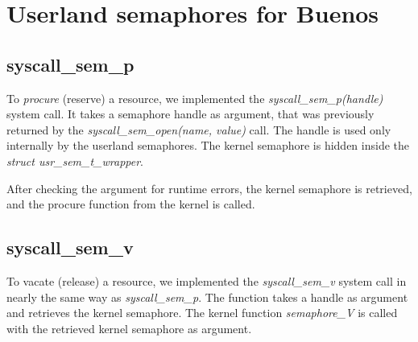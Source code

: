\documentclass[11pt]{article}
\begin{document}
\section{Userland semaphores for Buenos}
\subsection{syscall\_sem\_p}
To \emph{procure} (reserve) a resource, we implemented the \emph{syscall\_sem\_p(handle)} system call. It takes a semaphore handle as argument, that was previously returned by the \emph{syscall\_sem\_open(name, value)} call. The handle is used only internally by the userland semaphores. The kernel semaphore is hidden inside the \emph{struct usr\_sem\_t\_wrapper}.

After checking the argument for runtime errors, the kernel semaphore is retrieved, and the procure function from the kernel is called.








\subsection{syscall\_sem\_v}
To vacate (release) a resource, we implemented the \emph{syscall\_sem\_v} system call in nearly the same way as \emph{syscall\_sem\_p}. The function takes a handle as argument and retrieves the kernel semaphore. The kernel function \emph{semaphore\_V} is called with the retrieved kernel semaphore as argument.



\end{document}
